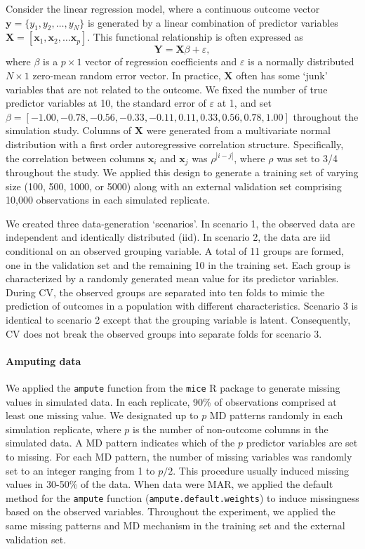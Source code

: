 \documentclass[AMA,STIX1COL,doublespace]{WileyNJD-v2}
\begin{document}
Consider the linear regression model, where a continuous outcome vector
\(\textbf{y} = \lbrace y_1, y_2, \ldots, y_N\rbrace\) is generated by a
linear combination of predictor variables
\(\textbf{X} = \left[ \textbf{x}_1, \textbf{x}_2, \ldots \textbf{x}_p \right]\).
This functional relationship is often expressed as
\[\textbf{Y} = \textbf{X} \beta + \varepsilon,\] where \(\beta\) is a
\(p \times 1\) vector of regression coefficients and \(\varepsilon\) is
a normally distributed \(N \times 1\) zero-mean random error vector. In
practice, \(\textbf{X}\) often has some `junk' variables that are not
related to the outcome. We fixed the number of true predictor variables
at 10, the standard error of \(\varepsilon\) at 1, and set
\(\beta = [-1.00, -0.78, -0.56, -0.33, -0.11, 0.11, 0.33, 0.56, 0.78, 1.00]\)
throughout the simulation study. Columns of \(\textbf{X}\) were
generated from a multivariate normal distribution with a first order
autoregressive correlation structure. Specifically, the correlation
between columns \(\textbf{x}_i\) and \(\textbf{x}_j\) was
\(\rho^{\left| i-j \right|}\), where \(\rho\) was set to 3/4 throughout
the study. We applied this design to generate a training set of varying
size (100, 500, 1000, or 5000) along with an external validation set
comprising 10,000 observations in each simulated replicate.

We created three data-generation `scenarios'. In scenario 1, the
observed data are independent and identically distributed (iid). In
scenario 2, the data are iid conditional on an observed grouping
variable. A total of 11 groups are formed, one in the validation set and
the remaining 10 in the training set. Each group is characterized by a
randomly generated mean value for its predictor variables. During CV,
the observed groups are separated into ten folds to mimic the prediction
of outcomes in a population with different characteristics. Scenario 3
is identical to scenario 2 except that the grouping variable is latent.
Consequently, CV does not break the observed groups into separate folds
for scenario 3.

\paragraph{Amputing data}

We applied the \texttt{ampute} function from the \texttt{mice} R package
to generate missing values in simulated data. In each replicate, 90\% of
observations comprised at least one missing value. We designated up to
\(p\) MD patterns randomly in each simulation replicate, where \(p\) is
the number of non-outcome columns in the simulated data. A MD pattern
indicates which of the \(p\) predictor variables are set to missing. For
each MD pattern, the number of missing variables was randomly set to an
integer ranging from 1 to \(p/2\). This procedure usually induced
missing values in 30-50\% of the data. When data were MAR, we applied
the default method for the \texttt{ampute} function
(\texttt{ampute.default.weights}) to induce missingness based on the
observed variables. Throughout the experiment, we applied the same
missing patterns and MD mechanism in the training set and the external
validation set.
\end{document}

